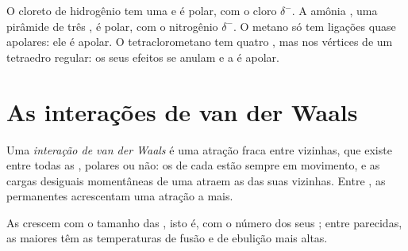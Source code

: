 \begin{example}\label{ex:g11:polarity-and-cohesion:four}
O cloreto de hidrogênio  tem uma  e é polar, com o
cloro $\delta^-$. A amônia , uma pirâmide de três  , é polar, com o nitrogênio $\delta^-$. O metano
 só tem ligações  quase apolares: ele é apolar. O
tetraclorometano  tem quatro  , mas
nos vértices de um tetraedro regular: os seus efeitos se anulam e a
 é apolar.
\end{example}

\section{As interações de van der Waals}

\begin{definition}\label{def:g11:polarity-and-cohesion:van-der-waals}
Uma \emph{interação de van der Waals} é
uma atração fraca entre  vizinhas, que existe entre todas as
, polares ou não: os  de cada  estão sempre em
movimento, e as cargas desiguais momentâneas de uma  atraem as
das suas vizinhas. Entre , as 
permanentes acrescentam uma atração a mais.
\end{definition}


\begin{proposition}\label{prop:g11:polarity-and-cohesion:size}
As  crescem com o tamanho das , isto
é, com o número dos seus ; entre  parecidas, as maiores
têm as temperaturas de fusão e de ebulição mais altas.
\end{proposition}

